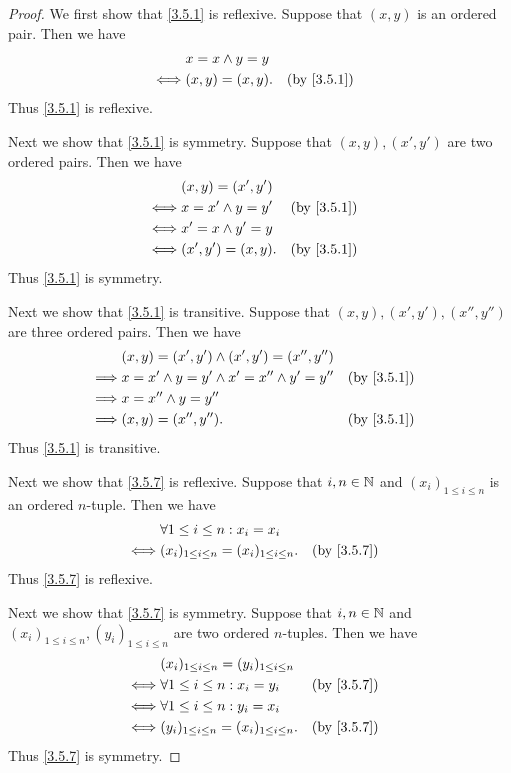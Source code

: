 \begin{proof}
  We first show that \cref{3.5.1} is reflexive.
  Suppose that \((x, y)\) is an ordered pair.
  Then we have
  \begin{align*}
         & x = x \land y = y                 \\
    \iff & (x, y) = (x, y).  &  & \by{3.5.1}
  \end{align*}
  Thus \cref{3.5.1} is reflexive.

  Next we show that \cref{3.5.1} is symmetry.
  Suppose that \((x, y), (x', y')\) are two ordered pairs.
  Then we have
  \begin{align*}
         & (x, y) = (x', y')                   \\
    \iff & x = x' \land y = y' &  & \by{3.5.1} \\
    \iff & x' = x \land y' = y                 \\
    \iff & (x', y') = (x, y).  &  & \by{3.5.1}
  \end{align*}
  Thus \cref{3.5.1} is symmetry.

  Next we show that \cref{3.5.1} is transitive.
  Suppose that \((x, y), (x', y'), (x'', y'')\) are three ordered pairs.
  Then we have
  \begin{align*}
             & (x, y) = (x', y') \land (x', y') = (x'', y'')                     \\
    \implies & x = x' \land y = y' \land x' = x'' \land y' = y'' &  & \by{3.5.1} \\
    \implies & x = x'' \land y = y''                                             \\
    \implies & (x, y) = (x'', y'').                              &  & \by{3.5.1}
  \end{align*}
  Thus \cref{3.5.1} is transitive.

  Next we show that \cref{3.5.7} is reflexive.
  Suppose that \(i, n \in \mathbb{N}\) and \((x_i)_{1 \leq i \leq n}\) is an ordered \(n\)-tuple.
  Then we have
  \begin{align*}
         & \forall 1 \leq i \leq n : x_i = x_i                                \\
    \iff & (x_i)_{1 \leq i \leq n} = (x_i)_{1 \leq i \leq n}. &  & \by{3.5.7}
  \end{align*}
  Thus \cref{3.5.7} is reflexive.

  Next we show that \cref{3.5.7} is symmetry.
  Suppose that \(i, n \in \mathbb{N}\) and \((x_i)_{1 \leq i \leq n}, (y_i)_{1 \leq i \leq n}\) are two ordered \(n\)-tuples.
  Then we have
  \begin{align*}
         & (x_i)_{1 \leq i \leq n} = (y_i)_{1 \leq i \leq n}                  \\
    \iff & \forall 1 \leq i \leq n : x_i = y_i                &  & \by{3.5.7} \\
    \iff & \forall 1 \leq i \leq n : y_i = x_i                                \\
    \iff & (y_i)_{1 \leq i \leq n} = (x_i)_{1 \leq i \leq n}. &  & \by{3.5.7}
  \end{align*}
  Thus \cref{3.5.7} is symmetry.


\end{proof}
